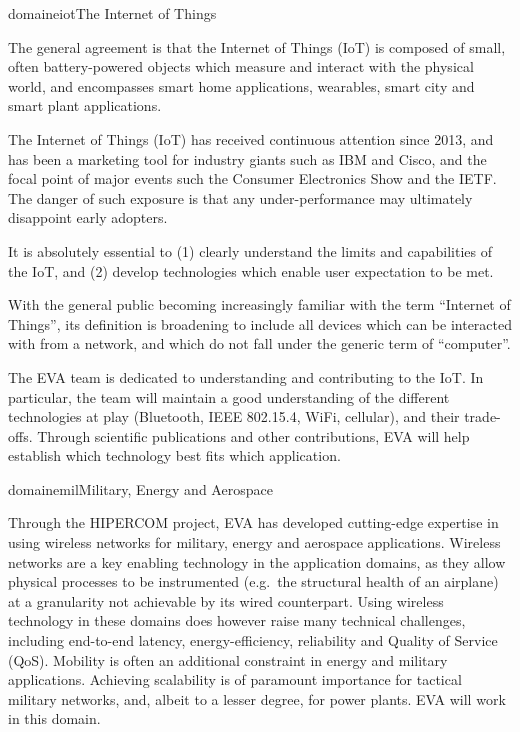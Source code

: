 \documentclass{ra2016}
\begin{document}
\begin{module}{domaine}{iot}{The Internet of Things}

The general agreement is that the Internet of Things (IoT) is composed of small, often battery-powered objects which measure and interact with the physical world, and encompasses smart home applications, wearables, smart city and smart plant applications.

The Internet of Things (IoT) has received continuous attention since 2013, and has been a marketing tool for industry giants such as IBM and Cisco, and the focal point of major events such the Consumer Electronics Show and the IETF. The danger of such exposure is that any under-performance may ultimately disappoint early adopters.

It is absolutely essential to (1) clearly understand the limits and capabilities of the IoT, and (2) develop technologies which enable user expectation to be met.

With the general public becoming increasingly familiar with the term ``Internet of Things'', its definition is broadening to include all devices which can be interacted with from a network, and which do not fall under the generic term of ``computer''.

The EVA team is dedicated to understanding and contributing to the IoT. In particular, the team will maintain a good understanding of the different technologies at play (Bluetooth, IEEE 802.15.4, WiFi, cellular), and their trade-offs. Through scientific publications and other contributions, EVA will help establish which technology best fits which application.

\end{module}

\begin{module}{domaine}{mil}{Military, Energy and Aerospace}

Through the HIPERCOM project, EVA has developed cutting-edge expertise in using wireless networks for military, energy and aerospace applications. Wireless networks are a key enabling technology in the application domains, as they allow physical processes to be instrumented (e.g.~the structural health of an airplane) at a granularity not achievable by its wired counterpart. Using wireless technology in these domains does however raise many technical challenges, including end-to-end latency, energy-efficiency, reliability and Quality of Service (QoS). Mobility is often an additional constraint  in energy and military applications. Achieving scalability is of paramount importance for tactical military networks, and, albeit to a lesser degree, for power plants. EVA will work in this domain.

\end{module}
\end{document}
